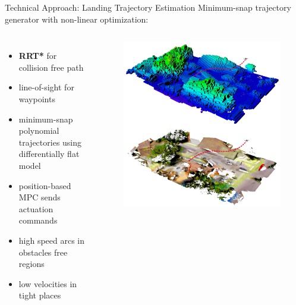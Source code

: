 \documentclass[10pt]{beamer}
\begin{document}
    \begin{frame}{Technical Approach: Landing Trajectory Estimation}
        Minimum-snap trajectory generator with non-linear optimization:
        \begin{columns}[c,onlytextwidth]
                \justifying
                \begin{itemize}
                    \item \textbf{RRT*} for collision free path
                    \item line-of-sight for waypoints
                    \item minimum-snap polynomial trajectories using
                        differentially flat model
                    \item position-based MPC sends actuation commands
                    \item high speed arcs in obstacles free regions
                    \item low velocities in tight places
                \end{itemize}
                \begin{figure}
                    \includegraphics[width=\textwidth]{images/Fig4.png}
                \end{figure}
        \end{columns}
    \end{frame}
\end{document}
